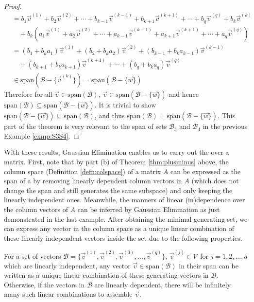 \begin{proof}
\begin{align*}
&= b_1\vec{v}^{(1)} + b_2\vec{v}^{(2)} + \cdots + b_{k-1}\vec{v}^{(k-1)} + b_{k+1}\vec{v}^{(k+1)} + \cdots + b_q\vec{v}^{(q)} + b_k\vec{v}^{(k)} \\
&\quad + b_k(a_1\vec{v}^{(1)} + a_2\vec{v}^{(2)} + \cdots + a_{k-1}\vec{v}^{(k-1)} + a_{k+1}\vec{v}^{(k+1)} + \cdots + a_q\vec{v}^{(q)}) \\
&= (b_1 + b_ka_1) \vec{v}^{(1)} + (b_2 + b_ka_2) \vec{v}^{(2)} + (b_{k-1} + b_ka_{k-1})\vec{v}^{(k-1)} \\
&\quad + (b_{k+1} + b_ka_{k+1}) \vec{v}^{(k+1)} + \cdots + (b_q + b_ka_q)\vec{v}^{(q)} \\
&\in \text{span}(\mathcal{B} - \{\vec{v}^{(k)}\}) = \text{span}(\mathcal{B} - \{\vec{w}\})
\end{align*}
Therefore for all $\vec{v} \in \text{span}(\mathcal{B})$, $\vec{v} \in \text{span}(\mathcal{B} - \{\vec{w}\})$ and hence $\text{span}(\mathcal{B}) \subseteq \text{span}(\mathcal{B} - \{\vec{w}\})$. It is trivial to show $\text{span}(\mathcal{B} - \{\vec{w}\}) \subseteq \text{span}(\mathcal{B})$, and thus $\text{span}(\mathcal{B}) = \text{span}(\mathcal{B} - \{\vec{w}\})$. This part of the theorem is very relevant to the span of sets $\mathcal{B}_3$ and $\mathcal{B}_4$ in the previous Example \ref{exmp:S3S4}.
\end{proof}
\newpage
With these results, Gaussian Elimination enables us to carry out the  over a matrix. First, note that by part (b) of Theorem \ref{thm:plusminus} above, the column space (Definition \ref{defn:colspace}) of a matrix $A$ can be expressed as the span of a  by removing linearly dependent column vectors in $A$ (which does not change the span and still generates the same subspace) and only keeping the linearly independent ones. Meanwhile, the manners of linear (in)dependence over the column vectors of $A$ can be inferred by Gaussian Elimination as just demonstrated in the last example. After obtaining the minimal generating set, we can express any vector in the column space as a unique linear combination of these linearly independent vectors inside the set due to the following properties.
\begin{proper}
\label{proper:lincombofspan}
For a set of vectors $\mathcal{B} = \{\vec{v}^{(1)}, \vec{v}^{(2)}, \vec{v}^{(3)}, \ldots, \vec{v}^{(q)}\}$, $\vec{v}^{(j)} \in \mathcal{V}$ for $j = 1,2,\ldots,q$ which are linearly independent, any vector $\vec{v} \in \text{span}(\mathcal{B})$ in their span can be written as a unique linear combination of these generating vectors in $\mathcal{B}$. Otherwise, if the vectors in $\mathcal{B}$ are linearly dependent, there will be infinitely many such linear combinations to assemble $\vec{v}$.
\end{proper}
